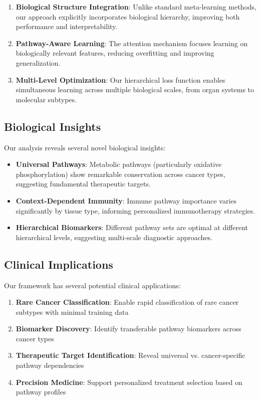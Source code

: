 \documentclass{article}
\begin{document}
\begin{enumerate}
\item \textbf{Biological Structure Integration}: Unlike standard meta-learning methods, our approach explicitly incorporates biological hierarchy, improving both performance and interpretability.

\item \textbf{Pathway-Aware Learning}: The attention mechanism focuses learning on biologically relevant features, reducing overfitting and improving generalization.

\item \textbf{Multi-Level Optimization}: Our hierarchical loss function enables simultaneous learning across multiple biological scales, from organ systems to molecular subtypes.
\end{enumerate}

\subsection{Biological Insights}

Our analysis reveals several novel biological insights:

\begin{itemize}
\item \textbf{Universal Pathways}: Metabolic pathways (particularly oxidative phosphorylation) show remarkable conservation across cancer types, suggesting fundamental therapeutic targets.

\item \textbf{Context-Dependent Immunity}: Immune pathway importance varies significantly by tissue type, informing personalized immunotherapy strategies.

\item \textbf{Hierarchical Biomarkers}: Different pathway sets are optimal at different hierarchical levels, suggesting multi-scale diagnostic approaches.
\end{itemize}

\subsection{Clinical Implications}

Our framework has several potential clinical applications:

\begin{enumerate}
\item \textbf{Rare Cancer Classification}: Enable rapid classification of rare cancer subtypes with minimal training data
\item \textbf{Biomarker Discovery}: Identify transferable pathway biomarkers across cancer types
\item \textbf{Therapeutic Target Identification}: Reveal universal vs. cancer-specific pathway dependencies
\item \textbf{Precision Medicine}: Support personalized treatment selection based on pathway profiles
\end{enumerate}
\end{document}

